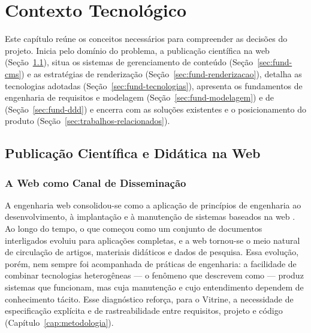 \chapter{Contexto Tecnológico}\label{cap:fundamentacao}

Este capítulo reúne os conceitos necessários para compreender as decisões do projeto. Inicia pelo domínio do problema, a publicação científica na web (Seção~\ref{sec:fund-publicacao}), situa os sistemas de gerenciamento de conteúdo (Seção~\ref{sec:fund-cms}) e as estratégias de renderização (Seção~\ref{sec:fund-renderizacao}), detalha as tecnologias adotadas (Seção~\ref{sec:fund-tecnologias}), apresenta os fundamentos de engenharia de requisitos e modelagem (Seção~\ref{sec:fund-modelagem}) e de  (Seção~\ref{sec:fund-ddd}) e encerra com as soluções existentes e o posicionamento do produto (Seção~\ref{sec:trabalhos-relacionados}).

\section{Publicação Científica e Didática na Web}\label{sec:fund-publicacao}

\subsection{A Web como Canal de Disseminação}

A engenharia web consolidou-se como a aplicação de princípios de engenharia ao desenvolvimento, à implantação e à manutenção de sistemas baseados na web \cite{ginige2001web}. Ao longo do tempo, o que começou como um conjunto de documentos interligados evoluiu para aplicações completas, e a web tornou-se o meio natural de circulação de artigos, materiais didáticos e dados de pesquisa. Essa evolução, porém, nem sempre foi acompanhada de práticas de engenharia: a facilidade de combinar tecnologias heterogêneas --- o fenômeno que  descrevem como  --- produz sistemas que funcionam, mas cuja manutenção e cujo entendimento dependem de conhecimento tácito. Esse diagnóstico reforça, para o Vitrine, a necessidade de especificação explícita e de rastreabilidade entre requisitos, projeto e código (Capítulo~\ref{cap:metodologia}).

